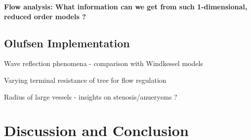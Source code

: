 \documentclass{beamer}
\begin{document}

\begin{frame}
	\begin{center}
		\Large{\textbf{Flow analysis: What information can we get from such 1-dimensional, reduced order models ?}}
	\end{center}
\end{frame}

\subsection{Olufsen Implementation}

\begin{frame}{Wave reflection phenomena - comparison with Windkessel models}

\end{frame}


\begin{frame}{Varying terminal resistance of tree for flow regulation}

\end{frame}


\begin{frame}{Radius of large vessels - insights on stenosis/anuerysms ?}

\end{frame}

\section{Discussion and Conclusion}

\end{document}
